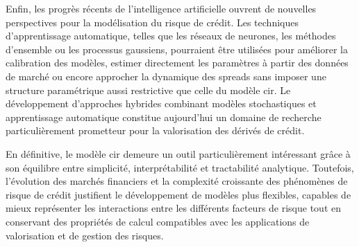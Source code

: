 Enfin, les progrès récents de l'intelligence artificielle ouvrent de nouvelles perspectives pour la modélisation du risque de crédit. Les techniques d'apprentissage automatique, telles que les réseaux de neurones, les méthodes d'ensemble ou les processus gaussiens, pourraient être utilisées pour améliorer la calibration des modèles, estimer directement les paramètres à partir des données de marché ou encore approcher la dynamique des spreads sans imposer une structure paramétrique aussi restrictive que celle du modèle \gls{cir}. Le développement d'approches hybrides combinant modèles stochastiques et apprentissage automatique constitue aujourd'hui un domaine de recherche particulièrement prometteur pour la valorisation des dérivés de crédit.

En définitive, le modèle \gls{cir} demeure un outil particulièrement intéressant grâce à son équilibre entre simplicité, interprétabilité et tractabilité analytique. Toutefois, l'évolution des marchés financiers et la complexité croissante des phénomènes de risque de crédit justifient le développement de modèles plus flexibles, capables de mieux représenter les interactions entre les différents facteurs de risque tout en conservant des propriétés de calcul compatibles avec les applications de valorisation et de gestion des risques.
